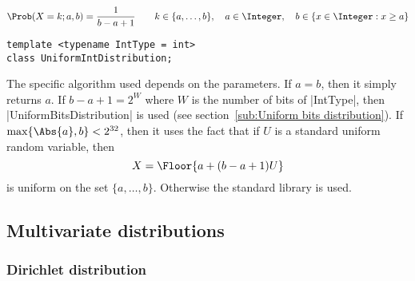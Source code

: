 \begin{equation*}
  \Prob(X = k;a,b) = \frac{1}{b - a + 1} \qquad
  k \in \{a,\dots,b\},\quad
  a \in \Integer,\quad b \in \{x \in \Integer: x \ge a\}
\end{equation*}
\begin{Verbatim}
template <typename IntType = int>
class UniformIntDistribution;
\end{Verbatim}
The specific algorithm used depends on the parameters. If $a = b$, then it
simply returns $a$. If $b - a + 1 = 2^W$ where $W$ is the number of bits of
|IntType|, then |UniformBitsDistribution| is used (see section~\ref{sub:Uniform
bits distribution}). If $\max\{\Abs{a}, b\} < 2^{32}$, then it uses the fact
that if $U$ is a standard uniform random variable, then
\begin{equation*}
  X = \Floor{a + (b - a + 1) U}
\end{equation*}
is uniform on the set $\{a,\dots,b\}$. Otherwise the standard library is used.

\subsection{Multivariate distributions}
\label{sub:Multivariate distributions}

\subsubsection{Dirichlet distribution}

